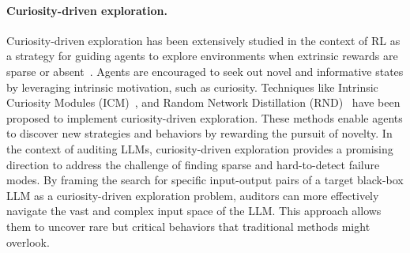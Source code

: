 \documentclass[letterpaper]{article} %
\begin{document}
\paragraph{Curiosity-driven exploration.} Curiosity-driven exploration has been extensively studied in the context of RL as a strategy for guiding agents to explore environments when extrinsic rewards are sparse or absent~\cite{zhang2021made,flet2021adversarially,liu2021aps,hazan2019provably,mutti2021task}. Agents are encouraged to seek out novel and informative states by leveraging intrinsic motivation, such as curiosity. Techniques like Intrinsic Curiosity Modules (ICM)~\cite{pathak2017curiosity}, and Random Network Distillation (RND)~\cite{burda2018exploration} have been proposed to implement curiosity-driven exploration. These methods enable agents to discover new strategies and behaviors by rewarding the pursuit of novelty. In the context of auditing LLMs, curiosity-driven exploration provides a promising direction to address the challenge of finding sparse and hard-to-detect failure modes. By framing the search for specific input-output pairs of a target black-box LLM as a curiosity-driven exploration problem, auditors can more effectively navigate the vast and complex input space of the LLM. This approach allows them to uncover rare but critical behaviors that traditional methods might overlook.
\end{document}
